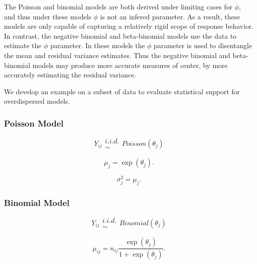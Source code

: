 \documentclass[12pt]{article}
\begin{document}
The Poisson and binomial models are both derived under limiting cases for 
$\phi$, and thus under these models $\phi$ is not an infered parameter. 
As a result, these models are only capable of capturing a relatively rigid 
scope of response behavior. In contrast, the negative binomial and 
beta-binomial models use the data to estimate the $\phi$ parameter. In these 
models the $\phi$ parameter is used to disentangle the mean and residual 
variance estimates. Thus the negative binomial and beta-binomial models may 
produce more accurate measures of center, by more accurately estimating
the residual variance. %

We develop an example on a subset of data to evaluate statistical support for
overdispersed models. 


%
\subsubsection{Poisson Model}

%
\begin{equation}
Y_{ij} \substack{i.i.d.\\\sim} Poisson(\theta_{j})
\end{equation}

\begin{equation}
\mu_{j} = \exp(\theta_{j}). %
\end{equation}

\begin{equation}
\sigma^2_{j} = \mu_{j}.
\end{equation}


%
\subsubsection{Binomial Model}

%
\begin{equation}
Y_{ij} \substack{i.i.d.\\\sim} Binomial(\theta_{j})
\end{equation}

\begin{equation}
\mu_{ij} = n_{ij}\frac{\exp(\theta_{j})}{1+\exp(\theta_{j})}.
\end{equation}
\end{document}
